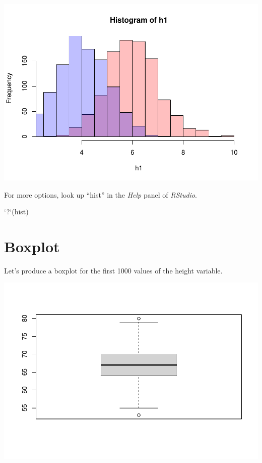 \documentclass[
]{book}
\newenvironment{Shaded}{\begin{snugshade}}{\end{snugshade}}
\newcommand{\DataTypeTok}[1]{\textcolor[rgb]{0.13,0.29,0.53}{#1}}
\newcommand{\DecValTok}[1]{\textcolor[rgb]{0.00,0.00,0.81}{#1}}
\newcommand{\KeywordTok}[1]{\textcolor[rgb]{0.13,0.29,0.53}{\textbf{#1}}}
\newcommand{\NormalTok}[1]{#1}
\newcommand{\OperatorTok}[1]{\textcolor[rgb]{0.81,0.36,0.00}{\textbf{#1}}}
\newcommand{\StringTok}[1]{\textcolor[rgb]{0.31,0.60,0.02}{#1}}
\begin{document}
\includegraphics{_main_files/figure-latex/unnamed-chunk-175-1.pdf}

For more options, look up ``hist'' in the \emph{Help} panel of \emph{RStudio}.

\begin{Shaded}
\begin{Highlighting}[]
\StringTok{`}\DataTypeTok{?}\StringTok{`}\NormalTok{(hist)}
\end{Highlighting}
\end{Shaded}

\hypertarget{boxplot}{%
\section{Boxplot}\label{boxplot}}

Let's produce a boxplot for the first 1000 values of the height variable.

\begin{Shaded}
\end{Shaded}

\includegraphics{_main_files/figure-latex/unnamed-chunk-177-1.pdf}
\end{document}
